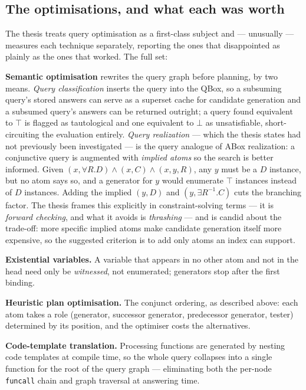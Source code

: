 \documentclass[11pt,a4paper,DIV=12,parskip=half]{scrartcl}
\begin{document}
\subsection{The optimisations, and what each was worth}

The thesis treats query optimisation as a first-class subject and --- unusually
--- measures each technique separately, reporting the ones that disappointed as
plainly as the ones that worked. The full set:

\textbf{Semantic optimisation} rewrites the query graph before planning, by two
means. \emph{Query classification} inserts the query into the QBox, so a
subsuming query's stored answers can serve as a superset cache for candidate
generation and a subsumed query's answers can be returned outright; a query
found equivalent to $\top$ is flagged as tautological and one equivalent to
$\bot$ as unsatisfiable, short-circuiting the evaluation entirely.
\emph{Query realization} --- which the thesis states had not previously been
investigated --- is the query analogue of ABox realization: a conjunctive query
is augmented with \emph{implied atoms} so the search is better informed. Given
$(x,\forall R.D) \wedge (x,C) \wedge (x,y,R)$, any $y$ must be a $D$ instance,
but no atom says so, and a generator for $y$ would enumerate $\top$ instances
instead of $D$ instances. Adding the implied $(y,D)$ and $(y,\exists R^{-1}.C)$
cuts the branching factor. The thesis frames this explicitly in constraint-solving
terms --- it is \emph{forward checking}, and what it avoids is \emph{thrashing}
--- and is candid about the trade-off: more specific implied atoms make candidate
generation itself more expensive, so the suggested criterion is to add only atoms
an index can support.

\textbf{Existential variables.} A variable that appears in no other atom and not
in the head need only be \emph{witnessed}, not enumerated; generators stop after
the first binding.

\textbf{Heuristic plan optimisation.} The conjunct ordering, as described above:
each atom takes a role (generator, successor generator, predecessor generator,
tester) determined by its position, and the optimiser costs the alternatives.

\textbf{Code-template translation.} Processing functions are generated by nesting
code templates at compile time, so the whole query collapses into a single
function for the root of the query graph --- eliminating both the per-node
\texttt{funcall} chain and graph traversal at answering time.
\end{document}
